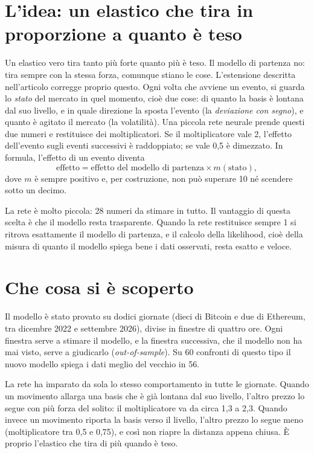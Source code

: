 \documentclass[a4paper,11pt]{article}
\begin{document}
\section*{L'idea: un elastico che tira in proporzione a quanto è teso}

Un elastico vero tira tanto più forte quanto più è teso. Il modello di partenza no: tira sempre con la stessa forza, comunque stiano le cose. L'estensione descritta nell'articolo corregge proprio questo. Ogni volta che avviene un evento, si guarda lo \emph{stato} del mercato in quel momento, cioè due cose: di quanto la basis è lontana dal suo livello, e in quale direzione la sposta l'evento (la \emph{deviazione con segno}), e quanto è agitato il mercato (la volatilità). Una piccola rete neurale prende questi due numeri e restituisce dei moltiplicatori. Se il moltiplicatore vale 2, l'effetto dell'evento sugli eventi successivi è raddoppiato; se vale 0,5 è dimezzato. In formula, l'effetto di un evento diventa
\[
\text{effetto} = \text{effetto del modello di partenza} \times m(\text{stato}),
\]
dove $m$ è sempre positivo e, per costruzione, non può superare 10 né scendere sotto un decimo.

La rete è molto piccola: 28 numeri da stimare in tutto. Il vantaggio di questa scelta è che il modello resta trasparente. Quando la rete restituisce sempre 1 si ritrova esattamente il modello di partenza, e il calcolo della likelihood, cioè della misura di quanto il modello spiega bene i dati osservati, resta esatto e veloce.

\section*{Che cosa si è scoperto}

Il modello è stato provato su dodici giornate (dieci di Bitcoin e due di Ethereum, tra dicembre 2022 e settembre 2026), divise in finestre di quattro ore. Ogni finestra serve a stimare il modello, e la finestra successiva, che il modello non ha mai visto, serve a giudicarlo (\emph{out-of-sample}). Su 60 confronti di questo tipo il nuovo modello spiega i dati meglio del vecchio in 56.

La rete ha imparato da sola lo stesso comportamento in tutte le giornate. Quando un movimento allarga una basis che è già lontana dal suo livello, l'altro prezzo lo segue con più forza del solito: il moltiplicatore va da circa 1,3 a 2,3. Quando invece un movimento riporta la basis verso il livello, l'altro prezzo lo segue meno (moltiplicatore tra 0,5 e 0,75), e così non riapre la distanza appena chiusa. È proprio l'elastico che tira di più quando è teso.
\end{document}
